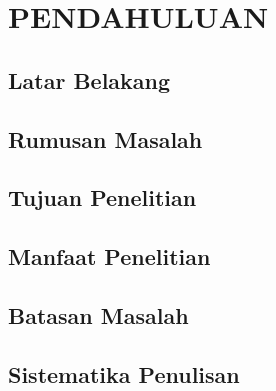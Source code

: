 \setcounter{page}{1}

\chapter{PENDAHULUAN}
\label{bab:pendahuluan}

\section{Latar Belakang}

\section{Rumusan Masalah}

\section{Tujuan Penelitian}

\section{Manfaat Penelitian}

\section{Batasan Masalah}

\section{Sistematika Penulisan}
